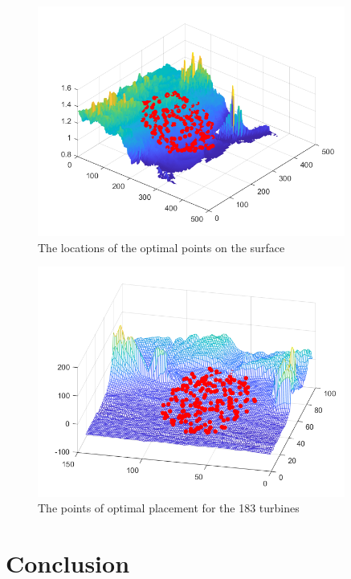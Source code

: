 \documentclass{beamer}
\begin{document}
\begin{frame}
  \begin{figure}
    \includegraphics[width=0.9\textwidth]{./figures/fig15.png}
    \caption{The locations of the optimal points on the surface}
  \end{figure}
\end{frame}
\begin{frame}
  \begin{figure}
    \includegraphics[width=0.9\textwidth]{./figures/fig18.png}
    \caption{The points of optimal placement for the 183 turbines}
  \end{figure}
\end{frame}

\section{Conclusion}
\end{document}
